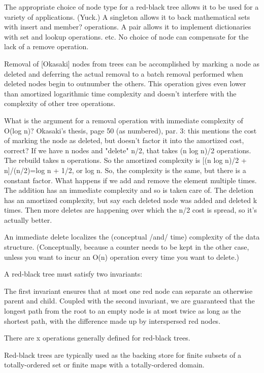 \documentclass[preprint]{sigplanconf}
\begin{document}
The appropriate choice of node type for a red-black tree allows it to be used for a variety of applications. (Yuck.) A singleton allows it to back mathematical sets with insert and member? operations. A pair allows it to implement dictionaries with set and lookup operations. etc. No choice of node can compensate for the lack of a remove operation.

Removal of [Okasaki] nodes from trees can be accomplished by marking a node as deleted and deferring the actual removal to a batch removal performed when deleted nodes begin to outnumber the others. This operation gives even lower than amortized logarithmic time complexity and doesn't interfere with the complexity of other tree operations.

What is the argument for a removal operation with immediate complexity of O(log n)?
Okasaki's thesis, page 50 (as numbered), par. 3: this mentions the cost of marking the node as deleted, but doesn't factor it into the amortized cost, correct? If we have n nodes and "delete" n/2, that takes (n log n)/2 operations. The rebuild takes n operations. So the amortized complexity is [(n log n)/2 + n]/(n/2)=log n + 1/2, or log n. So, the complexity is the same, but there is a constant factor. What happens if we add and remove the element multiple times. The addition has an immediate complexity and so is taken care of. The deletion has an amortized complexity, but say each deleted node was added and deleted k times. Then more deletes are happening over which the n/2 cost is spread, so it's actually better.

An immediate delete localizes the (conceptual /and/ time) complexity of the data structure. (Conceptually, because a counter needs to be kept in the other case, unless you want to incur an O(n) operation every time you want to delete.)

A red-black tree must satisfy two invariants:



The first invariant ensures that at most one red node can separate an otherwise parent and child. Coupled with the second invariant, we are guaranteed that the longest path from the root to an empty node is at most twice as long as the shortest path, with the difference made up by interspersed red nodes.

There are x operations generally defined for red-black trees.

Red-black trees are typically used as the backing store for finite subsets of 
a totally-ordered set or finite maps with a totally-ordered domain.
\end{document}
